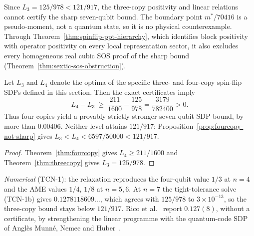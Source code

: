 \noindent Since $L_3=125/978<121/917$, the three-copy positivity and linear relations cannot certify the sharp
seven-qubit bound. The boundary point $m^*/70416$ is a pseudo-moment, not a quantum state, so it is no physical
counterexample. Through Theorem~\ref{thm:spinflip-ppt-hierarchy}, which identifies block positivity with operator
positivity on every local representation sector, it also excludes every homogeneous real cubic SOS proof of the sharp
bound (Theorem~\ref{thm:sextic-sos-obstruction}).

\begin{corollary}
\label{cor:strict-copy-hierarchy}
Let $L_3$ and $L_4$ denote the optima of the specific
three- and four-copy spin-flip SDPs defined in this section.
Then the exact certificates imply
\[
 L_4-L_3\ \ge\
 \frac{211}{1600}-\frac{125}{978}
 =\frac{3179}{782400}>0.
\]
Thus four copies yield a provably strictly stronger
seven-qubit SDP bound, by more than $0.00406$.
Neither level attains $121/917$: Proposition~\ref{prop:fourcopy-not-sharp} gives $L_3<L_4<6597/50000<121/917$.
\end{corollary}
\begin{proof}
Theorem~\ref{thm:fourcopy} gives $L_4\ge211/1600$ and Theorem~\ref{thm:threecopy} gives $L_3=125/978$.
\end{proof}

\noindent\emph{Numerical} (TCN-1): the relaxation reproduces the four-qubit value $1/3$ at $n=4$ and the AME
values $1/4$, $1/8$ at $n=5,6$. At $n=7$ the tight-tolerance solve (TCN-1b) gives $0.1278118609\ldots$, which
agrees with $125/978$ to $3\times10^{-13}$, so the three-copy bound stays below $121/917$. Rico et
al.~\cite{Rico} report $0.127(8)$, without a certificate, by strengthening the linear programme with the
quantum-code SDP of Angl\`es Munn\'e, Nemec and Huber~\cite{MNH}.
